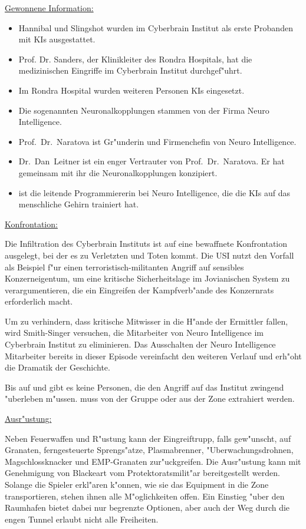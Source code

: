 \begin{remarks}
	\underline{Gewonnene Information:}
	
	\begin{itemize}
		\item Hannibal und Slingshot wurden im Cyberbrain Institut als erste Probanden mit KIs ausgestattet.
		\item Prof. Dr. Sanders, der Klinikleiter des Rondra Hospitals, hat die medizinischen Eingriffe im Cyberbrain Institut 
			durchgef"uhrt.
		\item Im Rondra Hospital wurden weiteren Personen KIs eingesetzt.
		\item Die sogenannten Neuronalkopplungen stammen von der Firma Neuro Intelligence.
		\item Prof.~Dr.~Naratova ist Gr"underin und Firmenchefin von Neuro Intelligence.
		\item Dr.~Dan~Leitner ist ein enger Vertrauter von Prof.~Dr.~Naratova. Er hat gemeinsam mit ihr die Neuronalkopplungen konzipiert.
		\item \ml{} ist die leitende Programmiererin bei Neuro Intelligence, die die KIs auf das menschliche Gehirn trainiert hat.
	\end{itemize}	 

	\underline{Konfrontation:}

	Die Infiltration des Cyberbrain Instituts ist auf eine bewaffnete Konfrontation ausgelegt, bei der es zu Verletzten und Toten kommt. Die USI nutzt den Vorfall als Beispiel f"ur einen terroristisch-militanten Angriff auf sensibles Konzerneigentum, um eine kritische Sicherheitslage im Jovianischen System zu verargumentieren, die ein Eingreifen der Kampfverb"ande des Konzernrats erforderlich macht.

	Um zu verhindern, dass kritische Mitwisser in die H"ande der Ermittler fallen, wird Smith-Singer versuchen, die Mitarbeiter von Neuro Intelligence im Cyberbrain Institut zu eliminieren. Das Ausschalten der Neuro Intelligence Mitarbeiter bereits in dieser Episode vereinfacht den weiteren Verlauf und erh"oht die Dramatik der Geschichte.
	
	Bis auf \ml{} und \xl{} gibt es keine Personen, die den Angriff auf das Institut zwingend "uberleben m"ussen. \ml{} muss von der Gruppe oder \xl{} aus der Zone extrahiert werden.

	\underline{Ausr"ustung:}

	Neben Feuerwaffen und R"ustung kann der Eingreiftrupp, falls gew"unscht, auf Granaten, ferngesteuerte Sprengs"atze, Plasmabrenner, "Uberwachungsdrohnen, Magschlossknacker und EMP-Granaten zur"uckgreifen. Die Ausr"ustung kann mit Genehmigung von Blackeart vom Protektoratsmilit"ar bereitgestellt werden. Solange die Spieler erkl"aren k"onnen, wie sie das Equipment in die Zone transportieren, stehen ihnen alle M"oglichkeiten offen. Ein Einstieg "uber den Raumhafen bietet dabei nur begrenzte Optionen, aber auch der Weg durch die engen Tunnel erlaubt nicht alle Freiheiten.
\end{remarks}
